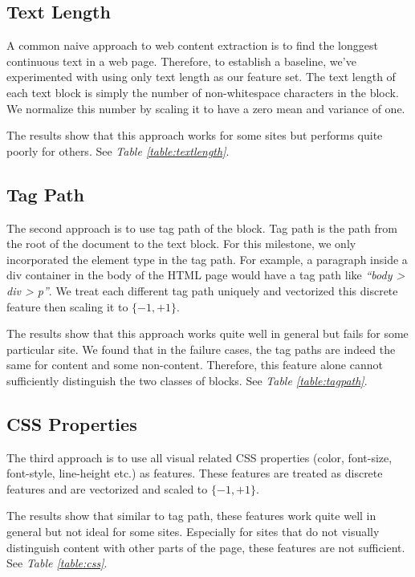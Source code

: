 \documentclass{acm_proc_article-sp}
\begin{document}
\subsection{Text Length}

A common naive approach to web content extraction is to find the longgest continuous text in a web page. Therefore, to establish a baseline, we've experimented with using only text length as our feature set. The text length of each text block is simply the number of non-whitespace characters in the block. We normalize this number by scaling it to have a zero mean and variance of one.

The results show that this approach works for some sites but performs quite poorly for others. See \emph{Table \ref{table:textlength}}.

\subsection{Tag Path}

The second approach is to use tag path of the block. Tag path is the path from the root of the document to the text block. For this milestone, we only incorporated the element type in the tag path. For example, a paragraph inside a div container in the body of the HTML page would have a tag path like \emph{``body > div > p''}. We treat each different tag path uniquely and vectorized this discrete feature then scaling it to $\{-1, +1\}$.

The results show that this approach works quite well in general but fails for some particular site. We found that in the failure cases, the tag paths are indeed the same for content and some non-content. Therefore, this feature alone cannot sufficiently distinguish the two classes of blocks. See \emph{Table \ref{table:tagpath}}.

\subsection{CSS Properties}

The third approach is to use all visual related CSS properties (color, font-size, font-style, line-height etc.) as features. These features are treated as discrete features and are vectorized and scaled to $\{-1, +1\}$.

The results show that similar to tag path, these features work quite well in general but not ideal for some sites. Especially for sites that do not visually distinguish content with other parts of the page, these features are not sufficient. See \emph{Table \ref{table:css}}.
\end{document}
